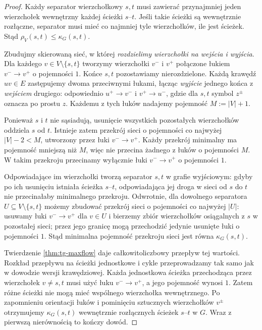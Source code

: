 \documentclass[11pt,a4paper]{report}
\numberwithin{equation}{section}
\theoremstyle{plain}
\theoremstyle{definition}
\theoremstyle{remark}
\begin{document}
\begin{proof}
Każdy separator wierzchołkowy $s,t$ musi zawierać
przynajmniej jeden wierzchołek wewnętrzny każdej
ścieżki $s$--$t$. Jeśli takie ścieżki są wewnętrznie
rozłączne, separator musi mieć co najmniej tyle
wierzchołków, ile jest ścieżek. Stąd
$\rho_V(s,t)\le\kappa_G(s,t)$.

Zbudujmy skierowaną sieć, w której \emph{rozdzielimy
wierzchołki na wejścia i wyjścia}. Dla każdego
$v\in V\setminus\{s,t\}$ tworzymy wierzchołki
$v^-$ i $v^+$ połączone łukiem $v^-\to v^+$
o pojemności $1$. Końce $s,t$ pozostawiamy
nierozdzielone. Każdą krawędź $uv\in E$
zastępujemy dwoma przeciwnymi łukami,
łącząc \emph{wyjście} jednego końca z \emph{wejściem}
drugiego: odpowiednio $u^+\to v^-$ i $v^+\to u^-$,
gdzie dla $s,t$ symbol $z^\pm$ oznacza po prostu $z$.
Każdemu z tych łuków nadajemy pojemność
$M:=|V|+1$.

Ponieważ $s$ i $t$ nie sąsiadują, usunięcie wszystkich
pozostałych wierzchołków oddziela $s$ od $t$.
Istnieje zatem przekrój sieci o pojemności co najwyżej
$|V|-2<M$, utworzony przez łuki $v^-\to v^+$.
Każdy przekrój minimalny ma pojemność mniejszą niż $M$,
więc nie przecina żadnego z łuków o pojemności $M$.
W takim przekroju przecinamy wyłącznie łuki
$v^-\to v^+$ o pojemności $1$.

Odpowiadające im wierzchołki tworzą separator
$s,t$ w grafie wyjściowym: gdyby po ich usunięciu
istniała ścieżka $s$--$t$, odpowiadająca jej droga
w sieci od $s$ do $t$ nie przecinałaby minimalnego
przekroju. Odwrotnie, dla dowolnego separatora
$U\subseteq V\setminus\{s,t\}$ możemy zbudować
przekrój sieci o pojemności co najwyżej $|U|$:
usuwamy łuki $v^-\to v^+$ dla $v\in U$ i bierzemy
zbiór wierzchołków osiągalnych z $s$ w pozostałej
sieci; przez jego granicę mogą przechodzić
jedynie usunięte łuki o pojemności $1$.
Stąd minimalna pojemność przekroju sieci jest
równa $\kappa_G(s,t)$.

Twierdzenie \ref{thm:tg-maxflow} daje całkowitoliczbowy
przepływ tej wartości. Rozkład przepływu na ścieżki
jednostkowe i cykle przeprowadzamy tak samo jak
w dowodzie wersji krawędziowej. Każda jednostkowa
ścieżka przechodząca przez wierzchołek $v\ne s,t$
musi użyć łuku $v^-\to v^+$, a jego pojemność wynosi $1$.
Zatem różne ścieżki nie mogą mieć wspólnego wierzchołka
wewnętrznego. Po zapomnieniu orientacji łuków
i pominięciu sztucznych wierzchołków $v^\pm$
otrzymujemy $\kappa_G(s,t)$ wewnętrznie rozłącznych
ścieżek $s$--$t$ w $G$. Wraz z pierwszą nierównością
to kończy dowód.
\end{proof}
\end{document}
